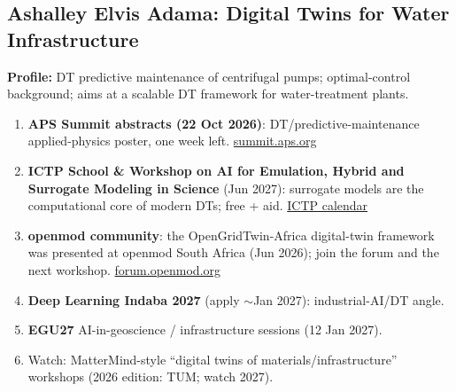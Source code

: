 \documentclass[11pt,a4paper]{article}
\begin{document}
\subsection{Ashalley Elvis Adama: Digital Twins for Water Infrastructure}
\textbf{Profile:} DT predictive maintenance of centrifugal pumps; optimal-control background; aims at a scalable DT framework for water-treatment plants.
\begin{enumerate}[leftmargin=1.6em]
  \item \textbf{APS Summit abstracts (22 Oct 2026)}: DT/predictive-maintenance applied-physics poster, one week left. \href{https://summit.aps.org/attend/abstracts/}{summit.aps.org}
  \item \textbf{ICTP School \& Workshop on AI for Emulation, Hybrid and Surrogate Modeling in Science} (Jun 2027): surrogate models are the computational core of modern DTs; free + aid. \href{https://www.ictp.it/home/scientific-calendar}{ICTP calendar}
  \item \textbf{openmod community}: the OpenGridTwin-Africa digital-twin framework was presented at openmod South Africa (Jun 2026); join the forum and the next workshop. \href{https://forum.openmod.org/}{forum.openmod.org}
  \item \textbf{Deep Learning Indaba 2027} (apply $\sim$Jan 2027): industrial-AI/DT angle.
  \item \textbf{EGU27} AI-in-geoscience / infrastructure sessions (12 Jan 2027).
  \item Watch: MatterMind-style ``digital twins of materials/infrastructure'' workshops (2026 edition: TUM; watch 2027).
\end{enumerate}
\end{document}
